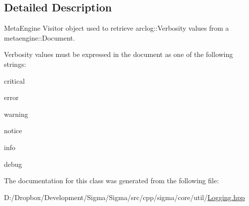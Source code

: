 \subsection{Detailed Description}
Meta\+Engine Visitor object used to retrieve arclog\+::\+Verbosity values from a metaengine\+::\+Document. 

Verbosity values must be expressed in the document as one of the following strings\+:


\begin{DoxyItemize}
\item critical
\item error
\item warning
\item notice
\item info
\item debug 
\end{DoxyItemize}

The documentation for this class was generated from the following file\+:\begin{DoxyCompactItemize}
\item 
D\+:/\+Dropbox/\+Development/\+Sigma/\+Sigma/src/cpp/sigma/core/util/\hyperlink{_logging_8hpp}{Logging.\+hpp}\end{DoxyCompactItemize}

